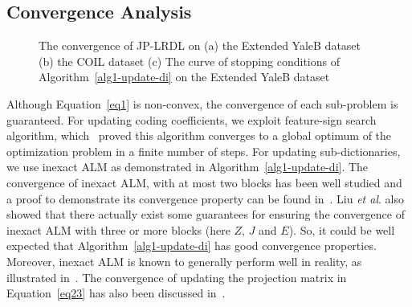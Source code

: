 \documentclass[journal]{IEEEtran}
\newcommand{\etal}{\textit{et al}.}
\begin{document}
\subsection{Convergence Analysis}
\begin{figure}[t]
\centering
{}  
\hspace{2pt} 
\vspace{-0.1em}
\caption{The convergence of JP-LRDL on (a) the Extended YaleB dataset (b) the COIL dataset (c) The curve of stopping conditions of Algorithm~\ref{alg1-update-di} on the Extended YaleB dataset}
\vspace{-1.5em}
\end{figure} 
Although Equation~\eqref{eq1} is non-convex, the convergence of each sub-problem is guaranteed. For updating coding coefficients, we exploit feature-sign search algorithm, which~\cite{Feature-Sign} proved this algorithm converges to a global optimum of the optimization problem in a finite number of steps. For updating sub-dictionaries, we use inexact ALM as demonstrated in Algorithm~\ref{alg1-update-di}. The convergence of inexact ALM, with at most two blocks has been well studied and a proof to demonstrate its convergence property can be found in~\cite{ALM-Proof}. Liu \etal\cite{IALM-3block} also showed that there actually exist some guarantees for ensuring the convergence of inexact ALM with three or more blocks (here $Z$, $J$ and $E$). So, it could be well expected that Algorithm~\ref{alg1-update-di} has good convergence properties. Moreover, inexact ALM is known to generally perform well in reality, as illustrated in~\cite{ADM-Tutorial}. The convergence of updating the projection matrix in Equation~\eqref{eq23} has also been discussed in~\cite{JDDRDL}. 
\end{document}
